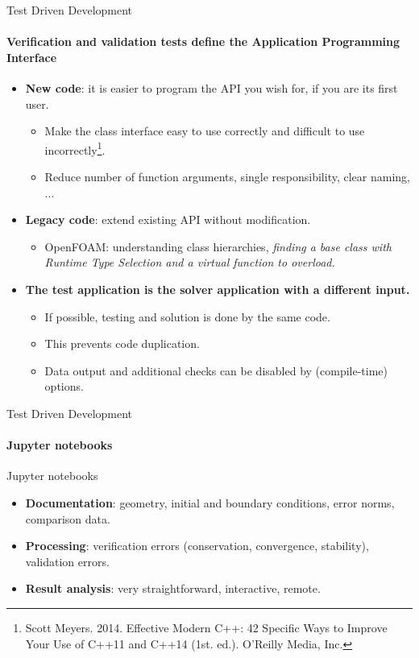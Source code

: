 \documentclass[
	aspectratio=169,%
	color={accentcolor=2d},
	logo=true,%
	colorframetitle=true,%
	]{tudabeamer}
\begin{document}
\begin{frame}{Test Driven Development} 
    \framesubtitle{Verification and validation tests define the Application Programming Interface}
        \vfill

    \begin{itemize}
        \item \textbf{New code}: it is easier to program the API you wish for, if you are its first user. 
            \begin{itemize}
                \item Make the class interface easy to use correctly and difficult to use incorrectly\footnote{Scott Meyers. 2014. Effective Modern C++: 42 Specific Ways to Improve Your Use of C++11 and C++14 (1st. ed.). O'Reilly Media, Inc.}.
                \item Reduce number of function arguments, single responsibility, clear naming, ... 
            \end{itemize}
        \item \textbf{Legacy code}: extend existing API without modification. 
            \begin{itemize}
                \item OpenFOAM: understanding class hierarchies, \textit{finding a base class with Runtime Type Selection and a virtual function to overload.}
            \end{itemize}
        \item \textbf{The test application is the solver application with a different input.}
            \begin{itemize}
                \item If possible, testing and solution is done by the same code.  
                \item This prevents code duplication. 
                \item Data output and additional checks can be disabled by (compile-time) options.
            \end{itemize}
    \end{itemize}

\end{frame}


\begin{frame}{Test Driven Development} 
    \framesubtitle{Jupyter notebooks}

    \vfill
    Jupyter notebooks 
    \begin{itemize}
        \item \textbf{Documentation}: geometry, initial and boundary conditions, error norms, comparison data.
        \item \textbf{Processing}: verification errors (conservation, convergence, stability), validation errors. 
        \item \textbf{Result analysis}: very straightforward, interactive, remote.
    \end{itemize}
\end{frame}
\end{document}

